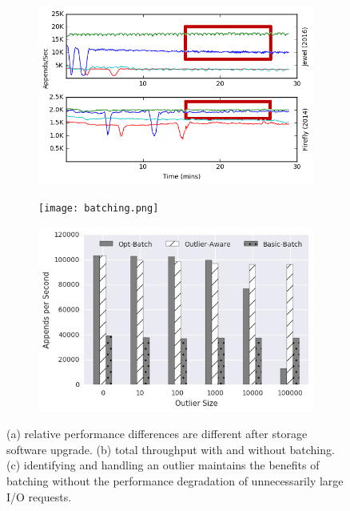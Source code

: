 \begin{figure}[t]
    \centering
    \begin{subfigure}[b]{.3\linewidth}
        \centering
        \includegraphics[width=1.0\linewidth]{jewel_v_firefly_pd.png}
        \caption{}
        \label{fig:phy-design}
    \end{subfigure}
    \begin{subfigure}[b]{.3\linewidth}
        \centering
        \texttt{[image: batching.png]}
        \caption{}
        \label{fig:batching}
    \end{subfigure}
    \begin{subfigure}[b]{.3\linewidth}
        \centering
        \includegraphics[width=1.0\linewidth]{batching-outlier-detect.png}
        \caption{}
        \label{fig:batching-outlier}
    \end{subfigure}
    \caption{(a) relative performance differences are different after storage
    software upgrade. (b) total throughput with and without batching. (c)
    identifying and handling an outlier maintains the benefits
    of batching without the performance degradation of unnecessarily large I/O
    requests.}
\end{figure}

